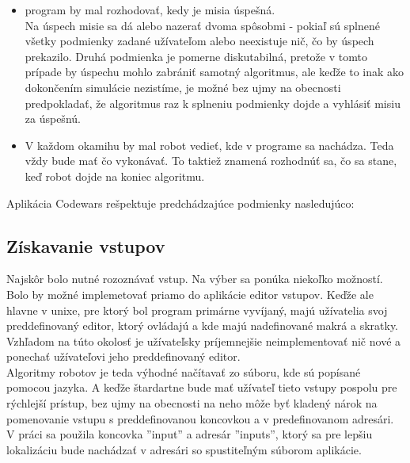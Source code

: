 \begin {itemize}
\item program by mal rozhodovať, kedy je misia úspešná.\\
	Na úspech misie sa dá alebo nazerať dvoma spôsobmi - pokiaľ sú splnené všetky podmienky zadané užívateľom alebo neexistuje nič, čo by úspech prekazilo. Druhá podmienka je pomerne diskutabilná, pretože v tomto prípade by úspechu mohlo zabrániť samotný algoritmus, ale keďže to inak ako dokončením simulácie nezistíme, je možné bez ujmy na obecnosti predpokladať, že algoritmus raz k splneniu podmienky dojde a vyhlásiť misiu za úspešnú.
\item V každom okamihu by mal robot vedieť, kde v programe sa nachádza. Teda vždy bude mať čo vykonávať. To taktiež znamená rozhodnúť sa, čo sa stane, keď robot dojde na koniec algoritmu. 
\end{itemize}

Aplikácia Codewars rešpektuje predchádzajúce podmienky nasledujúco:\\
\subsection {Získavanie vstupov}
\indent Najskôr bolo nutné rozoznávať vstup. Na výber sa ponúka niekoľko možností. Bolo by možné implemetovať priamo do aplikácie editor vstupov. Keďže ale hlavne v unixe, pre ktorý bol program primárne vyvíjaný, majú užívatelia svoj preddefinovaný editor, ktorý ovládajú a kde majú nadefinované makrá a skratky. Vzhľadom na túto okolosť je užívateľsky príjemnejšie neimplementovať nič nové a ponechať užívateľovi jeho preddefinovaný editor.\\
Algoritmy robotov je teda výhodné načítavať zo súboru, kde sú popísané pomocou jazyka. A keďže štardartne bude mať užívateľ tieto vstupy pospolu pre rýchlejší prístup, bez ujmy na obecnosti na neho môže byť kladený nárok na pomenovanie vstupu s preddefinovanou koncovkou a v predefinovanom adresári. V práci sa použila koncovka ''input'' a adresár ''inputs'', ktorý sa pre lepšiu lokalizáciu bude nachádzať v adresári so spustiteľným súborom aplikácie.

